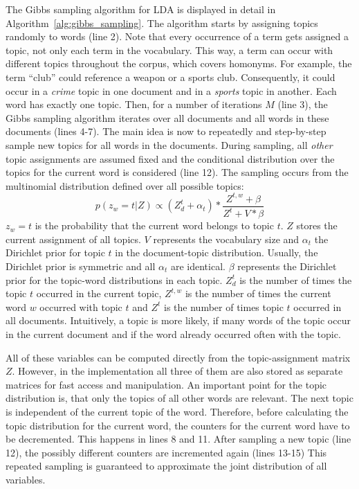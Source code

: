 \documentclass[
        a4paper,
        titlepage,
        twoside,
        parskip,
        numbers=noenddot
        ]{scrbook}
\theoremstyle{break}
\begin{document}
The Gibbs sampling algorithm for LDA is displayed in detail in Algorithm~\ref{alg:gibbs_sampling}.
The algorithm starts by assigning topics randomly to words (line 2).
Note that every occurrence of a term gets assigned a topic, not only each term in the vocabulary.
This way, a term can occur with different topics throughout the corpus, which covers homonyms.
For example, the term ``club'' could reference a weapon or a sports club.
Consequently, it could occur in a \emph{crime} topic in one document and in a \emph{sports} topic in another.
Each word has exactly one topic.
Then, for a number of iterations $M$ (line 3), the Gibbs sampling algorithm iterates over all documents and all words in these documents (lines 4-7).
The main idea is now to repeatedly and step-by-step sample new topics for all words in the documents.
During sampling, all \emph{other} topic assignments are assumed fixed and the conditional distribution over the topics for the current word is considered (line 12).
The sampling occurs from the multinomial distribution defined over all possible topics:
\begin{equation*}
  p(z_w = t | Z) \propto (Z_{d}^{t} + \alpha_t) * \frac{Z^{t, w} + \beta}{Z^{t} + V * \beta}
\end{equation*}
$z_w = t$ is the probability that the current word belongs to topic $t$.
$Z$ stores the current assignment of all topics.
$V$ represents the vocabulary size and $\alpha_t$ the Dirichlet prior for topic $t$ in the document-topic distribution.
Usually, the Dirichlet prior is symmetric and all $\alpha_t$ are identical.
$\beta$ represents the Dirichlet prior for the topic-word distributions in each topic.
$Z_{d}^{t}$ is the number of times the topic $t$ occurred in the current topic, $Z^{t, w}$ is the number of times the current word $w$ occurred with topic $t$ and $Z^t$ is the number of times topic $t$ occurred in all documents.
Intuitively, a topic is more likely, if many words of the topic occur in the current document and if the word already occurred often with the topic.

All of these variables can be computed directly from the topic-assignment matrix $Z$.
However, in the implementation all three of them are also stored as separate matrices for fast access and manipulation.
An important point for the topic distribution is, that only the topics of all other words are relevant.
The next topic is independent of the current topic of the word.
Therefore, before calculating the topic distribution for the current word, the counters for the current word have to be decremented.
This happens in lines 8 and 11.
After sampling a new topic (line 12), the possibly different counters are incremented again (lines 13-15)
This repeated sampling is guaranteed to approximate the joint distribution of all variables.
\end{document}
